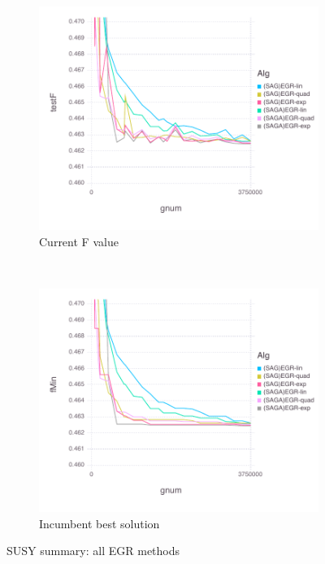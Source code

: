 \documentclass[11pt]{article}
\begin{document}
   \begin{figure}[H]
       \centering
       \begin{subfigure}[b]{0.45\textwidth}
           \includegraphics[width=\textwidth]{Figures/SUSYBLtrueFfFinal-1.pdf}
           \caption{Current F value}
       \end{subfigure}
       ~ %
         \begin{subfigure}[b]{0.45\textwidth}
             \includegraphics[width=\textwidth]{Figures/SUSYBLtrueFminfFinal-2.pdf}
             \caption{Incumbent best solution}
         \end{subfigure}
       \caption{SUSY summary: all EGR methods}\label{fig:SUSYsummary}
   \end{figure}
   
\end{document}
